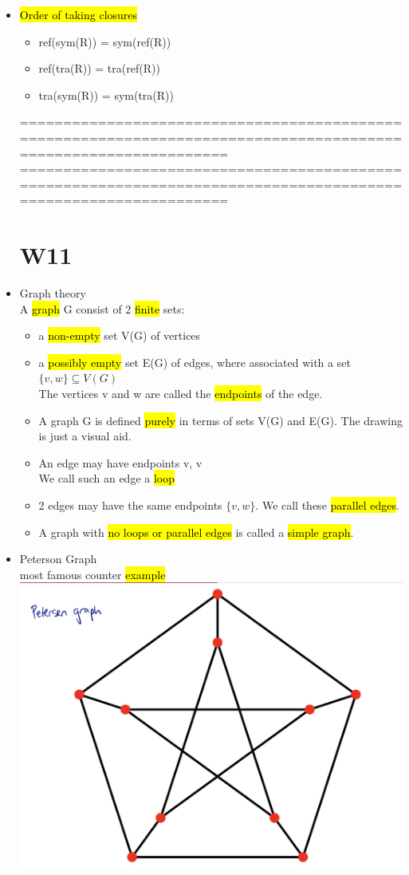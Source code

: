 \documentclass{article}
\begin{document}
\begin{itemize}
\item \hl{Order of taking closures}
\begin{itemize}
\item ref(sym(R)) = sym(ref(R))
\item ref(tra(R)) = tra(ref(R))
\item tra(sym(R)) = sym(tra(R))
\end{itemize}

================================================================================================================
\newpage
================================================================================================================\\

\section {W11} 

\item Graph theory\\
A \hl{graph} G consist of 2 \hl{finite} sets:
\begin{itemize}
\item a \hl{non-empty} set V(G) of vertices
\item a \hl{possibly empty} set E(G) of edges, where associated with a set $\{v,w\} \subseteq V(G)$\\
The vertices v and w are called the \hl{endpoints} of the edge.
\item A graph G is defined \hl{purely} in terms of sets V(G) and E(G).
The drawing is just a visual aid.
\item An edge may have endpoints {v, v}\\
We call such an edge a \hl{loop}
\item 2 edges may have the same endpoints $\{v,w\}$.
We call these \hl{parallel edges}.
\item A graph with \hl{no loops or parallel edges} is called a \hl{simple graph}.
\end{itemize}

\item Peterson Graph\\
most famous counter \hl{example}\\
\includegraphics[width=0.6\linewidth]{graph/24.jpg} \\%



\end{itemize}
\end{document}
